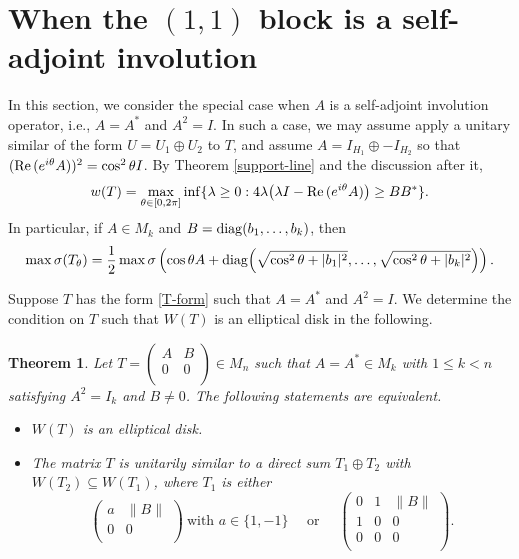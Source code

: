 \documentclass[11pt]{article}
\newtheorem{theorem}{Theorem}[section]
\numberwithin{equation}{section}
\def\diag{{\rm diag}}
\def\re{{\rm Re\,}}
\begin{document}
\section{When the $(1,1)$ block is a self-adjoint involution}

In this section, we consider the special case when
$A$ is a self-adjoint involution operator,
i.e., $A = A^*$ and $A^2= I$.
In such a case, we may assume apply a unitary similar of the form $U = U_1 \oplus U_2$ to $T$,
and assume $A = I_{H_1} \oplus -I_{H_2}$ so that $(\re(e^{i\theta}  A))^2 = \cos^2\theta I$.
By Theorem \ref{support-line}
and the discussion after it,
$$w(T) = \max_{\theta \in [0, 2\pi]}
\inf \{ \lambda \ge 0: 4\lambda\big(\lambda I - \re (e^{i\theta} A)\big)  \ge BB^* \}.$$
In particular, if $A\in M_k$ and $B = \diag(b_1, \dots, b_k)$, then
$$\max\sigma(T_\theta)=
\frac{1}{2}\max\sigma\left(\cos \theta A + \diag\Big(\sqrt{\cos^2\theta +| b_1|^2},
\dots, \sqrt{\cos^2\theta + |b_k|^2}\Big)\right).$$

Suppose  $T$ has the form \eqref{T-form}
such that $A=A^*$ and $A^2 = I$.
We determine the condition on $T$ such that $W(T)$ is an elliptical disk in the following.



\begin{theorem} \label{3.1}
Let  $T=\left(
         \begin{array}{cc}
           A & B \\
           0 & 0 \\
         \end{array}
       \right) \in M_n
$ such that $A = A^* \in M_k$ with $1\le k<n$
satisfying  $A^2 = I_k$ and $B\neq 0$.
The following statements are equivalent.
\begin{itemize}
\item[{\rm (a)}]  $W(T)$ is an elliptical disk.
\item[{\rm (b)}] The matrix $T$ is unitarily similar to a direct sum $T_1\oplus T_2$ with
$W(T_2) \subseteq W(T_1)$, where $T_1$ is either
$$
\left(
  \begin{array}{cc}
    a & \|B\| \\
    0 & 0 \\
  \end{array}
\right)\ \mbox{with } a\in\{1, -1\} \quad \mbox{ or }\quad \left(
                    \begin{array}{ccc}
                      0 & 1 & \|B\| \\
                      1 & 0 & 0 \\
                      0 & 0 & 0 \\
                    \end{array}
                  \right).
$$
\end{itemize}
\end{theorem}
\end{document}
